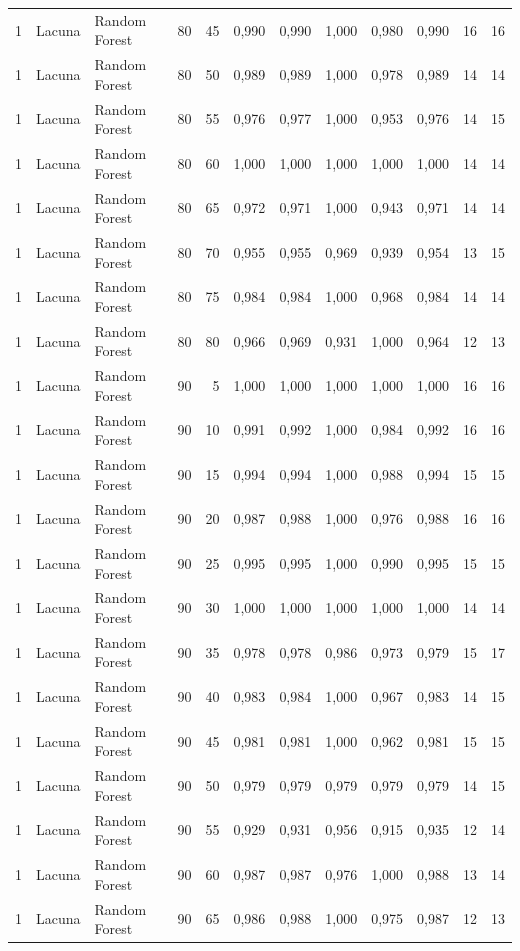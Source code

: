 \begin{longtable}{@{}rllrrrrrrrrr@{}}
1 & Lacuna & Random Forest & 80 & 45 & 0,990 & 0,990 & 1,000 & 0,980 & 0,990 & 16 & 16 \\
1 & Lacuna & Random Forest & 80 & 50 & 0,989 & 0,989 & 1,000 & 0,978 & 0,989 & 14 & 14 \\
1 & Lacuna & Random Forest & 80 & 55 & 0,976 & 0,977 & 1,000 & 0,953 & 0,976 & 14 & 15 \\
1 & Lacuna & Random Forest & 80 & 60 & 1,000 & 1,000 & 1,000 & 1,000 & 1,000 & 14 & 14 \\
1 & Lacuna & Random Forest & 80 & 65 & 0,972 & 0,971 & 1,000 & 0,943 & 0,971 & 14 & 14 \\
1 & Lacuna & Random Forest & 80 & 70 & 0,955 & 0,955 & 0,969 & 0,939 & 0,954 & 13 & 15 \\
1 & Lacuna & Random Forest & 80 & 75 & 0,984 & 0,984 & 1,000 & 0,968 & 0,984 & 14 & 14 \\
1 & Lacuna & Random Forest & 80 & 80 & 0,966 & 0,969 & 0,931 & 1,000 & 0,964 & 12 & 13 \\
1 & Lacuna & Random Forest & 90 & 5 & 1,000 & 1,000 & 1,000 & 1,000 & 1,000 & 16 & 16 \\
1 & Lacuna & Random Forest & 90 & 10 & 0,991 & 0,992 & 1,000 & 0,984 & 0,992 & 16 & 16 \\
1 & Lacuna & Random Forest & 90 & 15 & 0,994 & 0,994 & 1,000 & 0,988 & 0,994 & 15 & 15 \\
1 & Lacuna & Random Forest & 90 & 20 & 0,987 & 0,988 & 1,000 & 0,976 & 0,988 & 16 & 16 \\
1 & Lacuna & Random Forest & 90 & 25 & 0,995 & 0,995 & 1,000 & 0,990 & 0,995 & 15 & 15 \\
1 & Lacuna & Random Forest & 90 & 30 & 1,000 & 1,000 & 1,000 & 1,000 & 1,000 & 14 & 14 \\
1 & Lacuna & Random Forest & 90 & 35 & 0,978 & 0,978 & 0,986 & 0,973 & 0,979 & 15 & 17 \\
1 & Lacuna & Random Forest & 90 & 40 & 0,983 & 0,984 & 1,000 & 0,967 & 0,983 & 14 & 15 \\
1 & Lacuna & Random Forest & 90 & 45 & 0,981 & 0,981 & 1,000 & 0,962 & 0,981 & 15 & 15 \\
1 & Lacuna & Random Forest & 90 & 50 & 0,979 & 0,979 & 0,979 & 0,979 & 0,979 & 14 & 15 \\
1 & Lacuna & Random Forest & 90 & 55 & 0,929 & 0,931 & 0,956 & 0,915 & 0,935 & 12 & 14 \\
1 & Lacuna & Random Forest & 90 & 60 & 0,987 & 0,987 & 0,976 & 1,000 & 0,988 & 13 & 14 \\
1 & Lacuna & Random Forest & 90 & 65 & 0,986 & 0,988 & 1,000 & 0,975 & 0,987 & 12 & 13 \\

\end{longtable}
